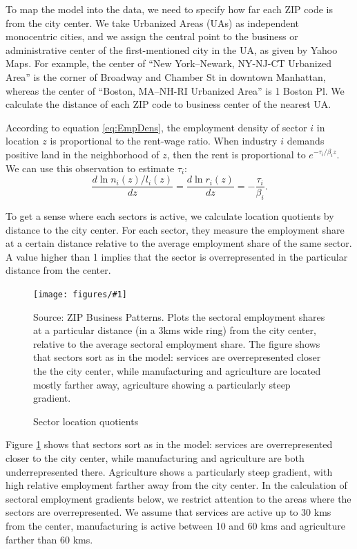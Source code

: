 \documentclass[12pt]{article}
\newcommand{\dofigure}[3]{\begin{figure}
\begin{centering}
\texttt{[image: figures/\#1]}
  \caption{#2\label{fig:#1}}
\end{centering}

\noindent \footnotesize{#3}
\end{figure}}
\begin{document}
To map the model into the data, we need to specify how far each ZIP code is from the city center. We take Urbanized Areas (UAs) as independent monocentric cities, and we assign the central point to the business or administrative center of the first-mentioned city in the UA, as given by Yahoo Maps. For example, the center of ``New York–Newark, NY-NJ-CT Urbanized Area'' is the corner of Broadway and Chamber St in downtown Manhattan, whereas the center of ``Boston, MA–NH-RI Urbanized Area'' is 1 Boston Pl. We calculate the distance of each ZIP code to business center of the nearest UA.

According to equation \ref{eq:EmpDens}, the employment density of sector $i$ in location $z$ is proportional to the rent-wage ratio. When industry $i$ demands positive land in the neighborhood of $z$, then the rent is proportional to $e^{-\tau_i/\beta_i z}$. We can use this observation to estimate $\tau_i$:
\[
\frac{d\ln n_i(z)/l_i(z)}{dz} =\frac{d\ln r_i(z)}{dz} = -\frac{\tau_i}{\beta_i}.
\]

To get a sense where each sectors is active, we calculate location quotients by distance to the city center. For each sector, they measure the employment share at a certain distance relative to the average employment share of the same sector. A value higher than 1 implies that the sector is overrepresented in the particular distance from the center.

\dofigure{sector_location_quotients}{Sector location quotients}{Source: ZIP Business Patterns. Plots the sectoral employment shares at a particular distance (in a 3kms wide ring) from the city center, relative to the average sectoral employment share. The figure shows that sectors sort as in the model: services are overrepresented closer the the city center, while manufacturing and agriculture are located mostly farther away, agriculture showing a particularly steep gradient.}

Figure \ref{fig:sector_location_quotients} shows that sectors sort as in the model: services are overrepresented closer to the city center, while manufacturing and agriculture are both underrepresented there. Agriculture shows a particularly steep gradient, with high relative employment farther away from the city center. In the calculation of sectoral employment gradients below, we restrict attention to the areas where the sectors are overrepresented. We assume that services are active up to 30 kms from the center, manufacturing is active between 10 and 60 kms and agriculture farther than 60 kms.
\end{document}
